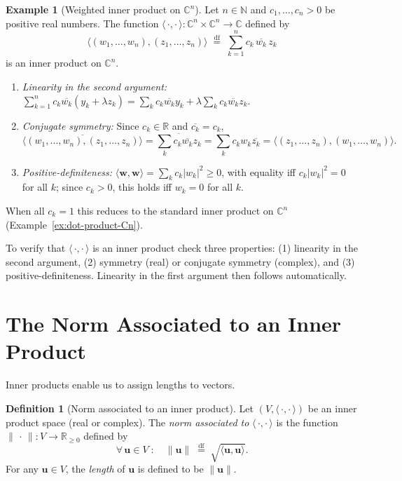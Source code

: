 \documentclass[11pt, a4paper, notitlepage]{report}
\theoremstyle{definition}
\newtheorem{definition}[theorem]{Definition}
\newtheorem{example}[theorem]{Example}
\theoremstyle{remark}
\begin{document}
\begin{example}[Weighted inner product on $\mathbb{C}^n$]
\label{ex:weighted-ip-Cn}
Let $n \in \mathbb{N}$ and $c_1,\ldots,c_n > 0$ be positive real numbers.
The function $\langle\,\cdot,\cdot\,\rangle : \mathbb{C}^n \times \mathbb{C}^n \to \mathbb{C}$
defined by
\[
  \langle(w_1,\ldots,w_n),(z_1,\ldots,z_n)\rangle
  \;\stackrel{\mathrm{df}}{=}\; \sum_{k=1}^n c_k\,\overline{w_k}\,z_k
\]
is an inner product on $\mathbb{C}^n$.
\begin{enumerate}
  \item \textit{Linearity in the second argument:}
        $\sum_{k=1}^n c_k \overline{w_k}(y_k + \lambda z_k)
        = \sum_k c_k\overline{w_k}y_k + \lambda\sum_k c_k\overline{w_k}z_k$.
  \item \textit{Conjugate symmetry:} Since $c_k \in \mathbb{R}$ and $\overline{c_k} = c_k$,
        \[
          \overline{\langle(w_1,\ldots,w_n),(z_1,\ldots,z_n)\rangle}
          = \overline{\sum_k c_k\overline{w_k}z_k}
          = \sum_k c_k w_k \overline{z_k}
          = \langle(z_1,\ldots,z_n),(w_1,\ldots,w_n)\rangle.
        \]
  \item \textit{Positive-definiteness:}
        $\langle\mathbf{w},\mathbf{w}\rangle = \sum_k c_k|w_k|^2 \geq 0$,
        with equality iff $c_k|w_k|^2 = 0$ for all $k$; since $c_k > 0$, this holds iff
        $w_k = 0$ for all $k$.
\end{enumerate}
When all $c_k = 1$ this reduces to the standard inner product on $\mathbb{C}^n$
(Example~\ref{ex:dot-product-Cn}).
\end{example}

\begin{keyresult}[title={Key Result: Axioms of an Inner Product}]
To verify that $\langle\,\cdot,\cdot\,\rangle$ is an inner product check three properties:
(1) linearity in the second argument, (2) symmetry (real) or conjugate symmetry (complex),
and (3) positive-definiteness. Linearity in the first argument then follows automatically.
\end{keyresult}

\section{The Norm Associated to an Inner Product}
\label{sec:norm}

Inner products enable us to assign lengths to vectors.

\begin{definition}[Norm associated to an inner product]
\label{def:norm-from-ip}
Let $(V,\langle\,\cdot,\cdot\,\rangle)$ be an inner product space (real or complex).
The \emph{norm associated to} $\langle\,\cdot,\cdot\,\rangle$ is the function
$\|\,\cdot\,\| : V \to \mathbb{R}_{\geq 0}$ defined by
\[
  \forall\,\mathbf{u}\in V\;:\quad \|\mathbf{u}\| \;\stackrel{\mathrm{df}}{=}\; \sqrt{\langle\mathbf{u},\mathbf{u}\rangle}.
\]
For any $\mathbf{u}\in V$, the \emph{length} of $\mathbf{u}$ is defined to be $\|\mathbf{u}\|$.
\end{definition}
\end{document}
